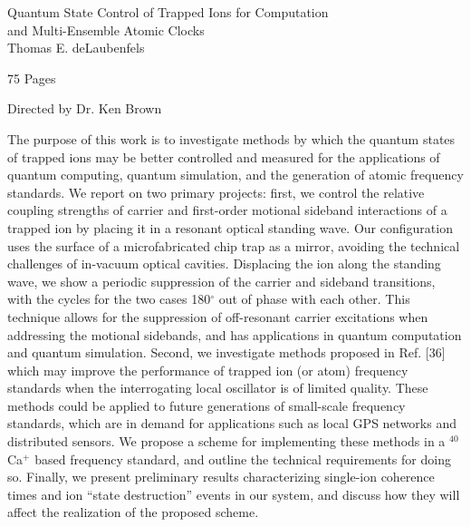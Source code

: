 \documentclass[12pt,amsmath]{report}   %
\begin{document}
\begin{center}

\begin{singlespacing}
\vspace{5\baselineskip}
Quantum State Control of Trapped Ions for Computation\\ 
and Multi-Ensemble Atomic Clocks \\

\vspace{1\baselineskip}
Thomas E. deLaubenfels

\vspace{1\baselineskip}
75 Pages

\vspace{1\baselineskip}
Directed by Dr. Ken Brown

\end{singlespacing}
\end{center}
\doublespacing 

\vspace{2\baselineskip}
The purpose of this work is to investigate methods by which the quantum states of trapped ions may be better controlled and measured for the applications of quantum computing, quantum simulation, and the generation of atomic frequency standards. We report on two primary projects: first, we control the relative coupling strengths of carrier and first-order motional sideband interactions of a trapped ion by placing it in a resonant optical standing wave. Our configuration uses the surface of a microfabricated chip trap as a mirror, avoiding the technical challenges of in-vacuum optical cavities. Displacing the ion along the standing wave, we show a periodic suppression of the carrier and sideband transitions, with the cycles for the two cases 180$^{\circ}$ out of phase with each other. This technique allows for the suppression of off-resonant carrier excitations when addressing the motional sidebands, and has applications in quantum computation and quantum simulation. Second, we investigate methods proposed in Ref. [36] which may improve the performance of trapped ion (or atom) frequency standards when the interrogating local oscillator is of limited quality. These methods could be applied to future generations of small-scale frequency standards, which are in demand for applications such as local GPS networks and distributed sensors. We propose a scheme for  implementing these methods in a $^{40}$Ca$^+$ based frequency standard, and outline the technical requirements for doing so. Finally, we present preliminary results characterizing single-ion coherence times and ion ``state destruction'' events in our system, and discuss how they will affect the realization of the proposed scheme. 
\end{document}

